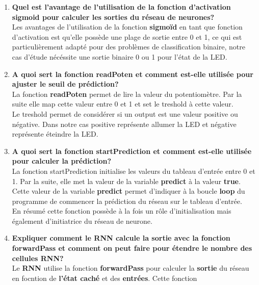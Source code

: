 \documentclass[a4paper, 12pt, openany]{book}
\begin{document}
\begin{enumerate}
  \item {
    \textbf{Quel est l'avantage de l'utilisation de la fonction d'activation sigmoid pour calculer les sorties du réseau de neurones?}\vspace{0.2cm}\\
    Les avantages de l'utilisation de la fonction \textbf{sigmoïd} en tant que fonction d'activation est qu'elle possède une plage de sortie entre 0 et 1, ce 
    qui est particulièrement adapté pour des problèmes de classification binaire, notre cas d'étude nécéssite une sortie binaire 0 ou 1 pour l'état de la LED.\@
  } \\
  \item {
    \textbf{A quoi sert la fonction readPoten et comment est-elle utilisée pour ajuster le seuil de prédiction?} \vspace{0.2cm}\\
    La fonction \textbf{readPoten} permet de lire la valeur du potentiomètre. Par la suite elle map cette valeur entre 0 et 1 et set le treshold à cette valeur.\\
    Le treshold permet de considérer si un output est une valeur positive ou négative. Dans notre cas positive représente allumer la LED et négative représente éteindre la LED.\@
  } \\\newpage
  \item {
    \textbf{A quoi sert la fonction startPrediction et comment est-elle utilisée pour calculer la prédiction?} \vspace{0.2cm}\\
    La fonction startPrediction initialise les valeurs du tableau d'entrée entre 0 et 1. Par la suite, elle met la valeur de la variable \textbf{predict} à la valeur \textbf{true}.
    Cette valeur de la variable \textbf{predict} permet d'indiquer à la boucle \textbf{loop} du programme de commencer la prédiction du réseau sur le tableau d'entrée.\\
    En résumé cette fonction possède à la fois un rôle d'initialisation mais également d'initiatrice du réseau de neurone.
  } \\
  \item {
    \textbf{Expliquer comment le RNN calcule la sortie avec la fonction forwardPass et comment on peut faire pour étendre le nombre des cellules RNN?} \vspace{0.2cm}\\
    Le \textbf{RNN} utilise la fonction \textbf{forwardPass} pour calculer la \textbf{sortie} du réseau en focntion de \textbf{l'état caché} et des \textbf{entrées}. Cette fonction 
}
\end{enumerate}
\end{document}
